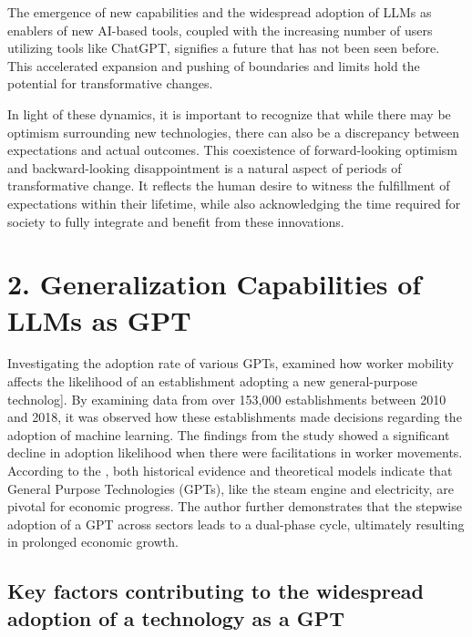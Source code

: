 \documentclass[preprint, 3p,
authoryear]{elsarticle} %
\begin{document}
The emergence of new capabilities and the widespread adoption of LLMs as
enablers of new AI-based tools, coupled with the increasing number of
users utilizing tools like ChatGPT, signifies a future that has not been
seen before. This accelerated expansion and pushing of boundaries and
limits hold the potential for transformative changes.

In light of these dynamics, it is important to recognize that while
there may be optimism surrounding new technologies, there can also be a
discrepancy between expectations and actual outcomes. This coexistence
of forward-looking optimism and backward-looking disappointment is a
natural aspect of periods of transformative change. It reflects the
human desire to witness the fulfillment of expectations within their
lifetime, while also acknowledging the time required for society to
fully integrate and benefit from these innovations.

\hypertarget{generalization-capabilities-of-llms-as-gpt}{%
\section{2. Generalization Capabilities of LLMs as
GPT}\label{generalization-capabilities-of-llms-as-gpt}}

Investigating the adoption rate of various GPTs, \citep{Chen2021HowDL}
examined how worker mobility affects the likelihood of an establishment
adopting a new general-purpose technolog{]}. By examining data from over
153,000 establishments between 2010 and 2018, it was observed how these
establishments made decisions regarding the adoption of machine
learning. The findings from the study showed a significant decline in
adoption likelihood when there were facilitations in worker movements.
According to the \citep{Helpman1996DiffusionOG}, both historical
evidence and theoretical models indicate that General Purpose
Technologies (GPTs), like the steam engine and electricity, are pivotal
for economic progress. The author further demonstrates that the stepwise
adoption of a GPT across sectors leads to a dual-phase cycle, ultimately
resulting in prolonged economic growth.

\hypertarget{key-factors-contributing-to-the-widespread-adoption-of-a-technology-as-a-gpt}{%
\subsection{Key factors contributing to the widespread adoption of a
technology as a
GPT}\label{key-factors-contributing-to-the-widespread-adoption-of-a-technology-as-a-gpt}}
\end{document}
